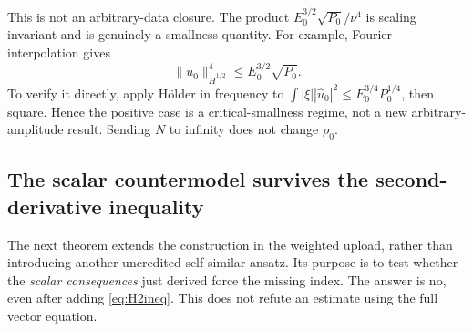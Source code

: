 \documentclass[11pt,a4paper]{article}
\theoremstyle{definition}\newtheorem{definition}[theorem]{Definition}
\theoremstyle{remark}\newtheorem{remark}[theorem]{Remark}
\newcommand{\norm}[1]{\lVert #1\rVert}
\numberwithin{equation}{section}
\begin{document}
This is not an arbitrary-data closure. The product $E_0^{3/2}\sqrt{P_0}/\nu^4$ is scaling invariant and is genuinely a smallness quantity. For example, Fourier interpolation gives
\begin{equation}\label{eq:halfinterpolation}
 \norm{u_0}_{\dot H^{1/2}}^4\le E_0^{3/2}\sqrt{P_0}.
\end{equation}
To verify it directly, apply H\"older in frequency to
$\int |\xi||\widehat u_0|^2\le E_0^{3/4}P_0^{1/4}$, then square. Hence the positive case is a critical-smallness regime, not a new arbitrary-amplitude result. Sending $N$ to infinity does not change $\rho_0$.

\subsection{The scalar countermodel survives the second-derivative inequality}
\label{sec:cap}
The next theorem extends the construction in the weighted upload, rather than introducing another uncredited self-similar ansatz. Its purpose is to test whether the \emph{scalar consequences} just derived force the missing index. The answer is no, even after adding \eqref{eq:H2ineq}. This does not refute an estimate using the full vector equation.
\end{document}
